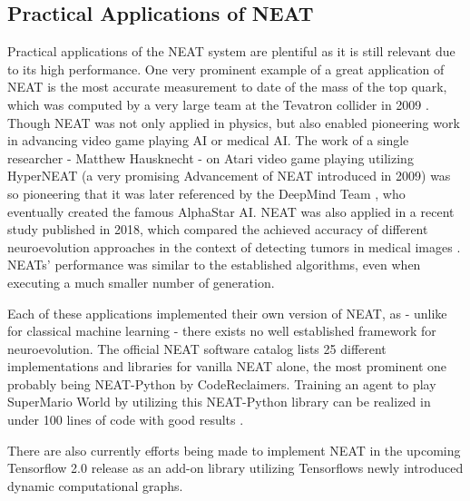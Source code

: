 \documentclass[journal, a4paper]{IEEEtran}
\begin{document}

\subsection{Practical Applications of NEAT}

Practical applications of the NEAT system are plentiful as it is still relevant due to its high performance. One very prominent example of a great application of NEAT is the most accurate measurement to date of the mass of the top quark, which was computed by a very large team at the Tevatron collider in 2009 \cite{aal09}. Though NEAT was not only applied in physics, but also enabled pioneering work in advancing video game playing AI or medical AI. 
The work \cite{hau12} of a single researcher - Matthew Hausknecht - on Atari video game playing utilizing HyperNEAT (a very promising Advancement of NEAT introduced in 2009) was so pioneering that it was later referenced by the DeepMind Team \cite{Mni13}, who eventually created the famous AlphaStar AI. NEAT was also applied in a recent study published in 2018, which compared the achieved accuracy of different neuroevolution approaches in the context of detecting tumors in medical images \cite{fra18}. NEATs' performance was similar to the established algorithms, even when executing a much smaller number of generation.
    
Each of these applications implemented their own version of NEAT, as - unlike for classical machine learning - there exists no well established framework for neuroevolution. The official NEAT software catalog \cite{neat_software19} lists 25 different implementations and libraries for vanilla NEAT alone, the most prominent one probably being NEAT-Python \cite{cod19} by CodeReclaimers. Training an agent to play SuperMario World by utilizing this NEAT-Python library can be realized in under 100 lines of code with good results \cite{pau19_smw}.

There are also currently efforts being made \cite{pau19_tefne} to implement NEAT in the upcoming Tensorflow 2.0 \cite{tf_beta19} release as an add-on \cite{tf_addons19} library utilizing Tensorflows newly introduced dynamic computational graphs.



\end{document}
